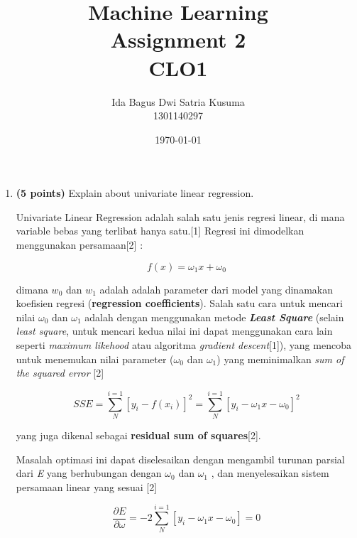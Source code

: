 \documentclass[12pt]{article}%
\begin{document}
\title{Machine Learning \protect\\ Assignment 2 \protect\\ CLO1} 
\author{Ida Bagus Dwi Satria Kusuma \protect\\ 1301140297}
\date{\today}
\maketitle

\begin{enumerate}
	\item \textbf{(5 points)} Explain about univariate linear regression.
	\par Univariate Linear Regression adalah salah satu jenis regresi linear, di mana variable bebas yang terlibat hanya satu.[1] Regresi ini dimodelkan menggunakan persamaan[2] : 

	\begin{equation}
		f(x) = \omega_1x + \omega_0
	\end{equation}

	\par dimana $w_0$ dan $w_1$ adalah adalah parameter dari model yang dinamakan koefisien regresi (\textbf{regression coefficients}). Salah satu cara untuk mencari nilai $\omega_0$ dan $\omega_1$ adalah dengan menggunakan metode \textit{\textbf{Least Square}} (selain \textit{least square}, untuk mencari kedua nilai ini dapat menggunakan cara lain seperti \textit{maximum likehood} atau algoritma \textit{gradient descent}[1]), yang mencoba untuk menemukan nilai parameter ($\omega_0$ dan $\omega_1$) yang meminimalkan \textit{sum of the squared error} [2]

	\begin{equation}
		SSE = \sum_{N}^{i=1} \left [ y_i - f(x_i) \right ] ^2 = \sum_{N}^{i=1} \left [ y_i - \omega_1x - \omega_0 \right ]^2
	\end{equation}

	\par yang juga dikenal sebagai \textbf{residual sum of squares}[2].
	\par Masalah optimasi ini dapat diselesaikan dengan mengambil turunan parsial dari \textit{E} yang berhubungan dengan $\omega_0$ dan $\omega_1$ , dan menyelesaikan sistem persamaan linear yang sesuai [2]

	\begin{equation}
		 \frac{\partial \textit{E}}{\partial \omega } = -2 \sum_{N}^{i=1} \left [ y_i - \omega_1x - \omega_0 \right ] = 0
	\end{equation}


\end{enumerate}
\end{document}
